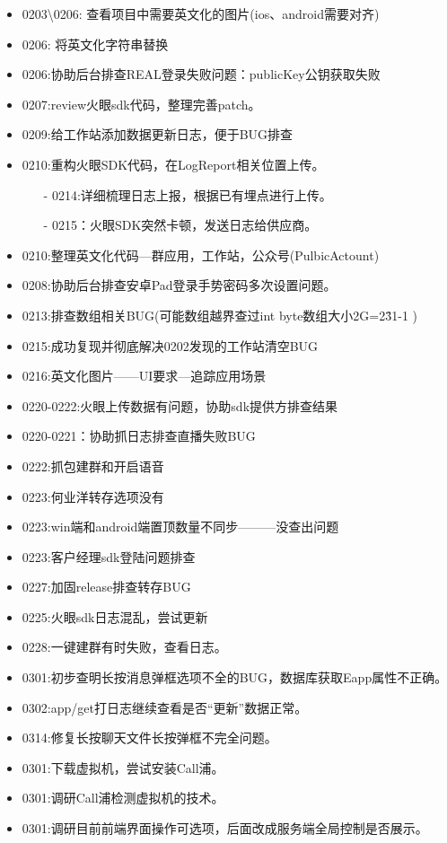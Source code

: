 \documentclass[12pt,a4paper]{ctexart}
\begin{document}
\begin{itemize}
		\item 0203\textbackslash0206: 查看项目中需要英文化的图片(ios、android需要对齐)
		\item 0206: 将英文化字符串替换
		\item 0206:协助后台排查REAL登录失败问题：publicKey公钥获取失败
		\item 0207:review火眼sdk代码，整理完善patch。
		\item 0209:给工作站添加数据更新日志，便于BUG排查
		\item 0210:重构火眼SDK代码，在LogReport相关位置上传。
		\begin{itemize}
			\item[-] 0214:详细梳理日志上报，根据已有埋点进行上传。
			\item[-] 0215：火眼SDK突然卡顿，发送日志给供应商。
		\end{itemize}
		\item 0210:整理英文化代码—群应用，工作站，公众号(PulbicActount)
		\item 0208:协助后台排查安卓Pad登录手势密码多次设置问题。
		\item 0213:排查数组相关BUG(可能数组越界查过int byte数组大小2G=2\^31-1 )
		\item 0215:成功复现并彻底解决0202发现的工作站清空BUG
		\item 0216:英文化图片——UI要求—追踪应用场景
		\item 0220-0222:火眼上传数据有问题，协助sdk提供方排查结果
		\item 0220-0221：协助抓日志排查直播失败BUG
		\item 0222:抓包建群和开启语音
		\item 0223:何业洋转存选项没有
		\item 0223:win端和android端置顶数量不同步———没查出问题
		\item 0223:客户经理sdk登陆问题排查
		\item 0227:加固release排查转存BUG
		\item 0225:火眼sdk日志混乱，尝试更新
		\item 0228:一键建群有时失败，查看日志。
		\item 0301:初步查明长按消息弹框选项不全的BUG，数据库获取Eapp属性不正确。
		\item 0302:app/get打日志继续查看是否“更新”数据正常。
		\item 0314:修复长按聊天文件长按弹框不完全问题。
		\item 0301:下载虚拟机，尝试安装Call浦。
		\item 0301:调研Call浦检测虚拟机的技术。
		\item 0301:调研目前前端界面操作可选项，后面改成服务端全局控制是否展示。

\end{itemize}
\end{document}
